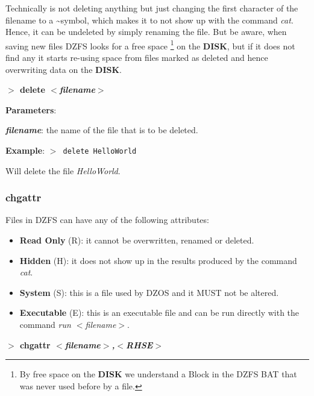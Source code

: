 \documentclass[a4paper,11pt]{article}
\begin{document}
        Technically is not deleting anything but just changing the first
        character of the filename to a \textasciitilde symbol, which makes it to
        not show up with the command \textit{cat}. Hence, it can be undeleted by
        simply renaming the file. But be aware, when saving new files DZFS looks
        for a free space \footnote{By free space on the \textbf{DISK} we
        understand a Block in the DZFS BAT that was never used before by a
        file.} on the \textbf{DISK}, but if it does not find any it starts
        re-using space from files marked as deleted and hence overwriting data
        on the \textbf{DISK}.

        \hspace{1.9cm}\textbf{$>$ delete \textit{$<$filename$>$}}

        \textbf{Parameters}:

        \hspace{1cm}\textbf{\textit{filename}}: the name of the file that is to
        be deleted.
        
        \textbf{Example}: \texttt{$>$ delete HelloWorld}

        Will delete the file \textit{HelloWorld}.

        \subsubsection{{\color{blue}chgattr}}
        Files in DZFS can have any of the following attributes:
        
        \begin{itemize}
            \item \textbf{Read Only} (R): it cannot be overwritten, renamed or
            deleted.
            \item \textbf{Hidden} (H): it does not show up in the results
            produced by the command \textit{cat}.
            \item \textbf{System} (S): this is a file used by DZOS and it MUST
            not be altered.
            \item \textbf{Executable} (E): this is an executable file and can be
            run directly with the command \textit{run $<$filename$>$}.
        \end{itemize}

        \hspace{1.9cm}\textbf{$>$ chgattr \textit{$<$filename$>$,$<$RHSE$>$}}
\end{document}
